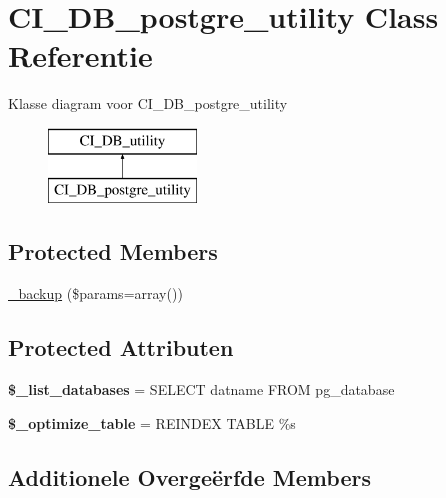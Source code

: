 \hypertarget{class_c_i___d_b__postgre__utility}{}\section{C\+I\+\_\+\+D\+B\+\_\+postgre\+\_\+utility Class Referentie}
\label{class_c_i___d_b__postgre__utility}
Klasse diagram voor C\+I\+\_\+\+D\+B\+\_\+postgre\+\_\+utility\begin{figure}[H]
\begin{center}
\leavevmode
\includegraphics[height=2.000000cm]{class_c_i___d_b__postgre__utility}
\end{center}
\end{figure}
\subsection*{Protected Members}
\begin{DoxyCompactItemize}
\item 
\mbox{\hyperlink{class_c_i___d_b__postgre__utility_a30f3053d2c82e7562349924363507afa}{\+\_\+backup}} (\$params=array())
\end{DoxyCompactItemize}
\subsection*{Protected Attributen}
\begin{DoxyCompactItemize}
\item 
\mbox{\label{class_c_i___d_b__postgre__utility_afe3a5b80562d93d6bc7e2b53c95b7e5a}} 
{\bfseries \$\+\_\+list\+\_\+databases} = \textquotesingle{}S\+E\+L\+E\+CT datname F\+R\+OM pg\+\_\+database\textquotesingle{}
\item 
\mbox{\label{class_c_i___d_b__postgre__utility_a083199e5c22c78912dae0a47bb2d7fad}} 
{\bfseries \$\+\_\+optimize\+\_\+table} = \textquotesingle{}R\+E\+I\+N\+D\+EX T\+A\+B\+LE \%s\textquotesingle{}
\end{DoxyCompactItemize}
\subsection*{Additionele Overge\"{e}rfde Members}


